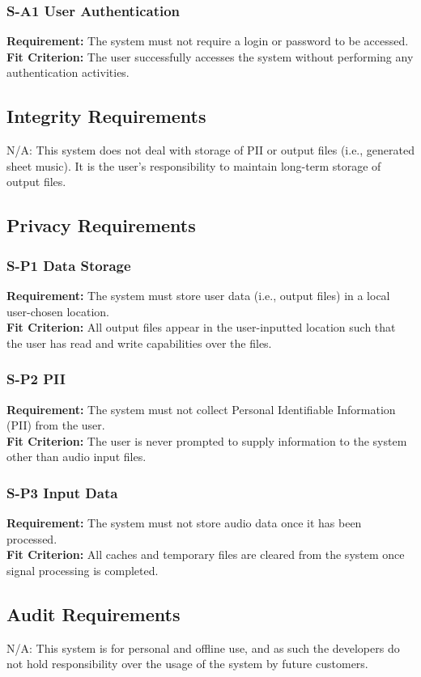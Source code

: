 \documentclass[12pt]{article}
\begin{document}
\subsubsection*{S-A1 User Authentication}
\textbf{Requirement:} The system must not require a login or password to be accessed. \\ 
\textbf{Fit Criterion:} The user successfully accesses the system without performing any authentication activities.

\subsection{Integrity Requirements}
N/A: This system does not deal with storage of PII or output files (i.e., generated sheet music). It is the user's responsibility to maintain long-term storage of output files.

\subsection{Privacy Requirements}
\subsubsection*{S-P1 Data Storage}
\textbf{Requirement:} The system must store user data (i.e., output files) in a local user-chosen location. \\ 
\textbf{Fit Criterion:} All output files appear in the user-inputted location such that the user has read and write capabilities over the files. 
\subsubsection*{S-P2 PII}
\textbf{Requirement:} The system must not collect Personal Identifiable Information (PII) from the user. \\ 
\textbf{Fit Criterion:} The user is never prompted to supply information to the system other than audio input files. 
\subsubsection*{S-P3 Input Data}
\textbf{Requirement:} The system must not store audio data once it has been processed. \\ 
\textbf{Fit Criterion:} All caches and temporary files are cleared from the system once signal processing is completed.

\subsection{Audit Requirements}
N/A: This system is for personal and offline use, and as such the developers do not hold responsibility over the usage of the system by future customers.
\end{document}
